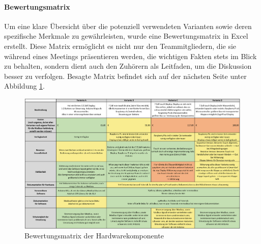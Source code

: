 \paragraph{Bewertungsmatrix}
Um eine klare Übersicht über die potenziell verwendeten Varianten sowie deren spezifische Merkmale zu gewährleisten, wurde eine Bewertungsmatrix in Excel erstellt. Diese Matrix ermöglicht es nicht nur den Teammitgliedern, die sie während eines Meetings präsentieren werden, die wichtigen Fakten stets im Blick zu behalten, sondern dient auch den Zuhörern als Leitfaden, um die Diskussion besser zu verfolgen. Besagte Matrix befindet sich auf der nächsten Seite unter Abbildung \ref{fig:matrix}.
\begin{landscape}
	\begin{figure}[H]
		\centering
		\includegraphics[width=1\linewidth]{Bilder/bewertungsmatrix}
		\caption{Bewertungsmatrix der Hardwarekomponente}
		\label{fig:matrix}
	\end{figure}
\end{landscape}